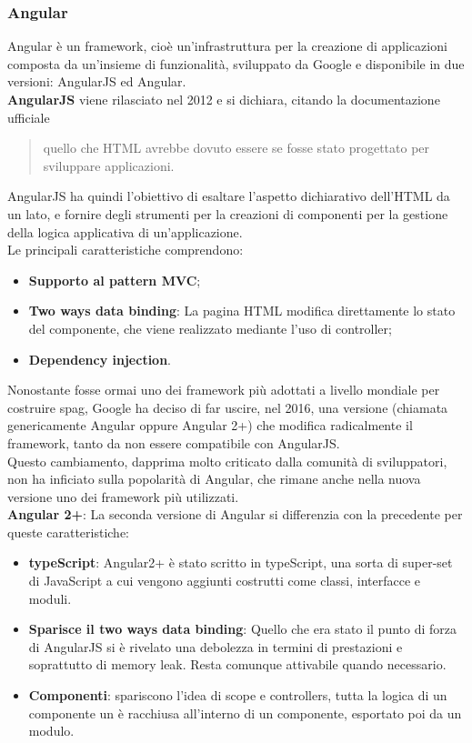 \subsubsection{Angular}
Angular è un framework, cioè un'infrastruttura per la creazione di applicazioni composta da un'insieme di funzionalità, sviluppato da Google e disponibile in due versioni: AngularJS ed Angular.\\
\textbf{AngularJS} viene rilasciato nel 2012 e si dichiara, citando la documentazione ufficiale 
\begin{quote}
quello che HTML avrebbe dovuto essere se fosse stato progettato per sviluppare applicazioni.
\end{quote}  %
AngularJS ha quindi l'obiettivo di esaltare l'aspetto dichiarativo dell'HTML da un lato, e fornire degli strumenti per la creazioni di componenti per la gestione della logica applicativa di un'applicazione.\\
Le principali caratteristiche comprendono:
\begin{itemize}
	\item \textbf{Supporto al pattern MVC};
	\item \textbf{Two ways data binding}: La pagina HTML modifica direttamente lo stato del componente, che viene realizzato mediante l'uso di controller;
	\item \textbf{Dependency injection}. %
\end{itemize}
Nonostante fosse ormai uno dei framework più adottati a livello mondiale per costruire \gls{spag}, Google ha deciso di far uscire, nel 2016, una versione (chiamata genericamente Angular oppure Angular 2+) che modifica radicalmente il framework, tanto da non essere compatibile con AngularJS.\\
Questo cambiamento, dapprima molto criticato dalla comunità di sviluppatori, non ha inficiato sulla popolarità di Angular, che rimane anche nella nuova versione uno dei framework più utilizzati.\\
\textbf{Angular 2+}: La seconda versione di Angular si differenzia con la precedente per queste caratteristiche:
\begin{itemize}
	\item \textbf{typeScript}: Angular2+ è stato scritto in typeScript, una sorta di super-set di JavaScript a cui vengono aggiunti costrutti come classi, interfacce e moduli.
	\item \textbf{Sparisce il two ways data binding}: Quello che era stato il punto di forza di AngularJS si è rivelato una debolezza in termini di prestazioni e soprattutto di memory leak. Resta comunque attivabile quando necessario.
	\item \textbf{Componenti}: spariscono l'idea di scope e controllers, tutta la logica di un componente un è racchiusa all'interno di un componente, esportato poi da un modulo. %
\end{itemize}

